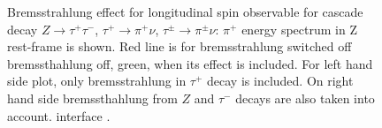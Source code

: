 \documentclass[]{Photos_interface_design}
\begin{document}
\begin{figure}[h!]
\centering
{}
\caption{ Bremsstrahlung effect for longitudinal spin observable
for cascade decay $Z \to \tau^+ \tau^-$, $\tau^+ \to \pi^+ \nu$,  $\tau^\pm \to \pi^\pm\nu$:
$\pi^+$ energy spectrum in Z rest-frame  is shown. Red line is for 
bremsstrahlung switched off
bremssthahlung off, green, when its effect is included. 
For left hand side plot,  only  bremsstrahlung in  $\tau^+ $ decay is included.
On right hand side bremssthahlung from $Z$ and  $\tau^-$ decays are
 also taken into account.
interface  \label{fig:KKMC}.
}
\end{figure}
\end{document}
